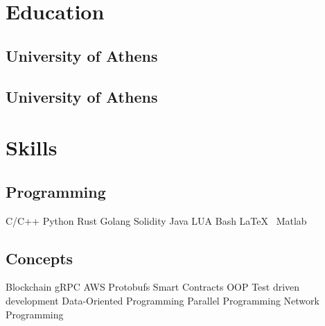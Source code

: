 \documentclass[]{deedy-resume-openfont}
\begin{document}
%
%
\lastupdated

%
%

%
%

\begin{minipage}[t]{0.33\textwidth}


\section{Education}

\subsection{University of Athens}
\sectionsep

\subsection{University of Athens}
\sectionsep
\sectionsep


\section{Skills}
\subsection{Programming}
C/C++ \textbullet{}
Python \textbullet{}
Rust \textbullet{}
Golang \textbullet{}
Solidity \textbullet{}
Java \textbullet{}
LUA \textbullet{}
Bash \textbullet{}
\LaTeX\ \textbullet{}
Matlab \\
\sectionsep

\subsection{Concepts}
Blockchain \textbullet{}
gRPC \textbullet{}
AWS \textbullet{}
Protobufs \textbullet{}
Smart Contracts \textbullet{}
OOP \textbullet{}
Test driven development \textbullet{}
Data-Oriented Programming \textbullet{}
Parallel Programming \textbullet{}
Network Programming
\sectionsep


\end{minipage}
\end{document}
